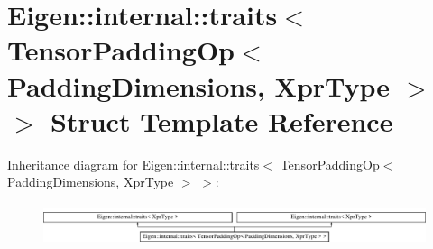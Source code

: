 \hypertarget{struct_eigen_1_1internal_1_1traits_3_01_tensor_padding_op_3_01_padding_dimensions_00_01_xpr_type_01_4_01_4}{}\section{Eigen\+:\+:internal\+:\+:traits$<$ Tensor\+Padding\+Op$<$ Padding\+Dimensions, Xpr\+Type $>$ $>$ Struct Template Reference}
\label{struct_eigen_1_1internal_1_1traits_3_01_tensor_padding_op_3_01_padding_dimensions_00_01_xpr_type_01_4_01_4}
Inheritance diagram for Eigen\+:\+:internal\+:\+:traits$<$ Tensor\+Padding\+Op$<$ Padding\+Dimensions, Xpr\+Type $>$ $>$\+:\begin{figure}[H]
\begin{center}
\leavevmode
\includegraphics[height=1.241685cm]{struct_eigen_1_1internal_1_1traits_3_01_tensor_padding_op_3_01_padding_dimensions_00_01_xpr_type_01_4_01_4}
\end{center}
\end{figure}
